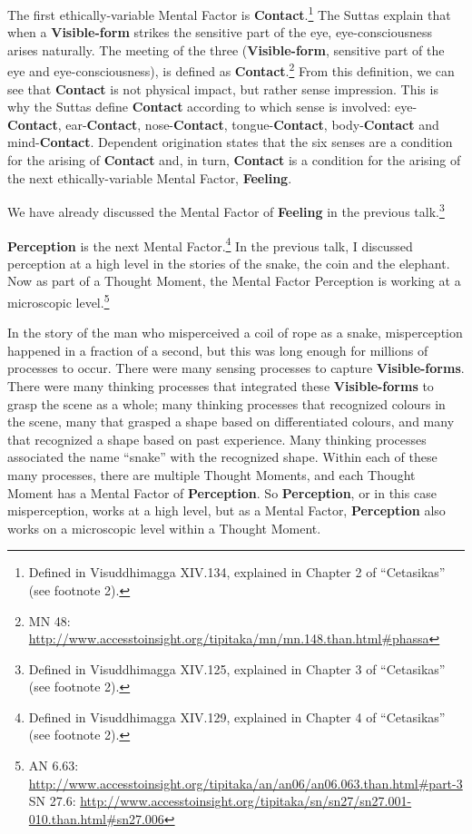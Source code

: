 The first ethically-variable Mental Factor is \textbf{Contact}.\footnote{Defined in Visuddhimagga XIV.134, explained in Chapter 2 of “Cetasikas” (see footnote 2).} The Suttas explain that when a \textbf{Visible-form} strikes the sensitive part of the eye, eye-consciousness arises naturally. The meeting of the three (\textbf{Visible-form}, sensitive part of the eye and eye-consciousness), is defined as \textbf{Contact}.\footnote{MN 48: \url{http://www.accesstoinsight.org/tipitaka/mn/mn.148.than.html\#phassa}} From this definition, we can see that \textbf{Contact} is not physical impact, but rather sense impression. This is why the Suttas define \textbf{Contact} according to which sense is involved: eye-\textbf{Contact}, ear-\textbf{Contact}, nose-\textbf{Contact}, tongue-\textbf{Contact}, body-\textbf{Contact} and mind-\textbf{Contact}. Dependent origination states that the six senses are a condition for the arising of \textbf{Contact} and, in turn, \textbf{Contact} is a condition for the arising of the next ethically-variable Mental Factor, \textbf{Feeling}.

We have already discussed the Mental Factor of \textbf{Feeling} in the previous talk.\footnote{Defined in Visuddhimagga XIV.125, explained in Chapter 3 of “Cetasikas” (see footnote 2).}

\textbf{Perception} is the next Mental Factor.\footnote{Defined in Visuddhimagga XIV.129, explained in Chapter 4 of “Cetasikas” (see footnote 2).} In the previous talk, I discussed perception at a high level in the stories of the snake, the coin and the elephant. Now as part of a Thought Moment, the Mental Factor Perception is working at a microscopic level.\footnote{AN 6.63: \url{http://www.accesstoinsight.org/tipitaka/an/an06/an06.063.than.html\#part-3}\\SN 27.6: \url{http://www.accesstoinsight.org/tipitaka/sn/sn27/sn27.001-010.than.html\#sn27.006}}

In the story of the man who misperceived a coil of rope as a snake, misperception happened in a fraction of a second, but this was long enough for millions of processes to occur. There were many sensing processes to capture \textbf{Visible-forms}. There were many thinking processes that integrated these \textbf{Visible-forms} to grasp the scene as a whole; many thinking processes that recognized colours in the scene, many that grasped a shape based on differentiated colours, and many that recognized a shape based on past experience. Many thinking processes associated the name “snake” with the recognized shape. Within each of these many processes, there are multiple Thought Moments, and each Thought Moment has a Mental Factor of \textbf{Perception}. So \textbf{Perception}, or in this case misperception, works at a high level, but as a Mental Factor, \textbf{Perception} also works on a microscopic level within a Thought Moment.


